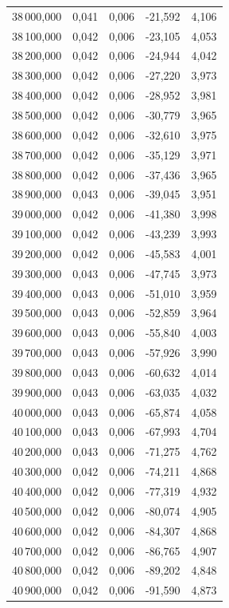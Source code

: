 \begin{longtable}{rrrrr}
38\,000,000 & 0,041 & 0,006 & -21,592 & 4,106\\
38\,100,000 & 0,042 & 0,006 & -23,105 & 4,053\\
38\,200,000 & 0,042 & 0,006 & -24,944 & 4,042\\
38\,300,000 & 0,042 & 0,006 & -27,220 & 3,973\\
38\,400,000 & 0,042 & 0,006 & -28,952 & 3,981\\
38\,500,000 & 0,042 & 0,006 & -30,779 & 3,965\\
38\,600,000 & 0,042 & 0,006 & -32,610 & 3,975\\
38\,700,000 & 0,042 & 0,006 & -35,129 & 3,971\\
38\,800,000 & 0,042 & 0,006 & -37,436 & 3,965\\
38\,900,000 & 0,043 & 0,006 & -39,045 & 3,951\\
39\,000,000 & 0,042 & 0,006 & -41,380 & 3,998\\
39\,100,000 & 0,042 & 0,006 & -43,239 & 3,993\\
39\,200,000 & 0,042 & 0,006 & -45,583 & 4,001\\
39\,300,000 & 0,043 & 0,006 & -47,745 & 3,973\\
39\,400,000 & 0,043 & 0,006 & -51,010 & 3,959\\
39\,500,000 & 0,043 & 0,006 & -52,859 & 3,964\\
39\,600,000 & 0,043 & 0,006 & -55,840 & 4,003\\
39\,700,000 & 0,043 & 0,006 & -57,926 & 3,990\\
39\,800,000 & 0,043 & 0,006 & -60,632 & 4,014\\
39\,900,000 & 0,043 & 0,006 & -63,035 & 4,032\\
40\,000,000 & 0,043 & 0,006 & -65,874 & 4,058\\
40\,100,000 & 0,043 & 0,006 & -67,993 & 4,704\\
40\,200,000 & 0,043 & 0,006 & -71,275 & 4,762\\
40\,300,000 & 0,042 & 0,006 & -74,211 & 4,868\\
40\,400,000 & 0,042 & 0,006 & -77,319 & 4,932\\
40\,500,000 & 0,042 & 0,006 & -80,074 & 4,905\\
40\,600,000 & 0,042 & 0,006 & -84,307 & 4,868\\
40\,700,000 & 0,042 & 0,006 & -86,765 & 4,907\\
40\,800,000 & 0,042 & 0,006 & -89,202 & 4,848\\
40\,900,000 & 0,042 & 0,006 & -91,590 & 4,873\\

\end{longtable}
